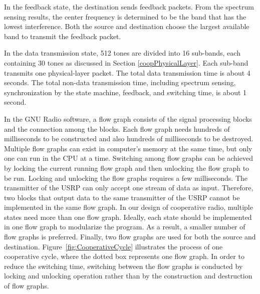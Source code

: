 In the feedback state, the destination sends feedback packets. From the spectrum sensing results, the center frequency is determined to be the band that has the lowest interference. Both the source and destination choose the largest available band to transmit the feedback packet.

In the data transmission state, 512 tones are divided into 16 sub-bands, each containing 30 tones as discussed in Section \ref{coopPhysicalLayer}. Each sub-band transmits one physical-layer packet. The total data transmission time is about 4 seconds. The total non-data transmission time, including spectrum sensing, synchronization by the state machine, feedback, and switching time, is about 1 second.

In the GNU Radio software, a flow graph consists of the signal processing blocks and the connection among the blocks. Each flow graph needs hundreds of milliseconds to be constructed and also hundreds of milliseconds to be destroyed. Multiple flow graphs can exist in computer's memory at the same time, but only one can run in the CPU at a time. Switching among flow graphs can be achieved by locking the current running flow graph and then unlocking the flow graph to be run. Locking and unlocking the flow graphs requires a few milliseconds. The transmitter of the USRP can only accept one stream of data as input. Therefore, two blocks that output data to the same transmitter of the USRP cannot be implemented in the same flow graph. In our design of cooperative radio, multiple states need more than one flow graph. Ideally, each state should be implemented in one flow graph to modularize the program. As a result, a smaller number of flow graphs is preferred. Finally, two flow graphs are used for both the source and destination. Figure~\ref{fig:CooperativeCycle} illustrates the process of one cooperative cycle, where the dotted box represents one flow graph. In order to reduce the switching time, switching between the flow graphs is conducted by locking and unlocking operation rather than by the construction and destruction of flow graphs.

